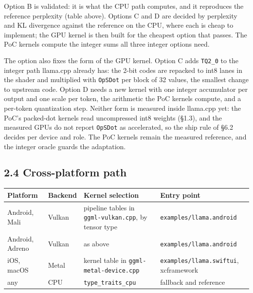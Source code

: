 \documentclass[
  10pt,
]{article}
\makeatletter
\newcounter{none} %
\newcommand{\needlines}[1]{\par\penalty-100\begingroup%
  \setlength{\dimen@}{#1\baselineskip}%
  \setlength{\dimen@ii}{\dimexpr\pagegoal-\pagetotal\relax}%
  \ifdim\dimen@>\dimen@ii\ifdim\dimen@ii>\z@\vfil\fi\break\fi%
  \endgroup}
\makeatother
\begin{document}
Option B is validated: it is what the CPU path computes, and it
reproduces the reference perplexity (table above). Options C and D are
decided by perplexity and KL divergence against the
reference on the CPU, where each is cheap to implement; the GPU kernel
is then built for the cheapest option that passes. The PoC kernels
compute the integer sums all three integer options need.

The option also fixes the form of the GPU kernel. Option C adds
\texttt{TQ2\_0} to the integer path llama.cpp already has: the 2-bit
codes are repacked to int8 lanes in the shader and multiplied with
\texttt{OpSDot} per block of 32 values, the smallest change to upstream
code. Option D needs a new kernel with one integer accumulator per
output and one scale per token, the arithmetic the PoC kernels compute,
and a per-token quantization step. Neither form is measured inside
llama.cpp yet: the PoC's packed-dot kernels read uncompressed int8
weights (\S{}1.3), and the measured GPUs do not report \texttt{OpSDot}
as accelerated, so the ship rule of \S{}6.2 decides per device and role.
The PoC kernels remain the measured reference, and the integer oracle
guards the adaptation.

\needlines{8}
\subsection{2.4 Cross-platform path}\label{cross-platform-path}

{\def\LTcaptype{none} %
\begin{longtable}[]{@{}
  >{\raggedright\arraybackslash}p{}
  >{\raggedright\arraybackslash}p{}
  >{\raggedright\arraybackslash}p{}
  >{\raggedright\arraybackslash}p{}@{}}
\toprule\noalign{}
\begin{minipage}[b]{\linewidth}\raggedright%
Platform
\end{minipage} & \begin{minipage}[b]{\linewidth}\raggedright%
Backend
\end{minipage} & \begin{minipage}[b]{\linewidth}\raggedright%
Kernel selection
\end{minipage} & \begin{minipage}[b]{\linewidth}\raggedright%
Entry point
\end{minipage} \\
\midrule\noalign{}
\endhead%
\bottomrule\noalign{}
\endlastfoot%
Android, Mali & Vulkan & pipeline tables in \texttt{ggml-vulkan.cpp}, by
tensor type & \texttt{examples/llama.android} \\
Android, Adreno & Vulkan & as above & \texttt{examples/llama.android} \\
iOS, macOS & Metal & kernel table in \texttt{ggml-metal-device.cpp} &
\texttt{examples/llama.swiftui}, xcframework \\
any & CPU & \texttt{type\_traits\_cpu} & fallback and reference \\
\end{longtable}
}
\end{document}

